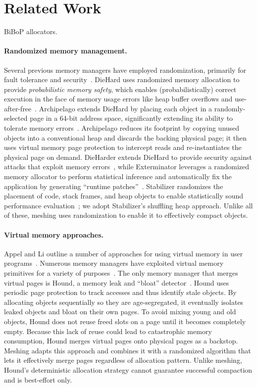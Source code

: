 \section{Related Work}
\label{sec:related}

BiBoP allocators.

\paragraph{Randomized memory management.} Several previous memory managers have employed randomization,
primarily for fault tolerance and
security~\cite{Novark:2010:DSH:1866307.1866371, 1134000, 1346296,
  1250736}. DieHard uses randomized memory allocation to provide
\emph{probabilistic memory safety}, which enables (probabilistically)
correct execution in the face of memory usage errors like heap buffer
overflows and use-after-free~\cite{1134000}. Archipelago extends
DieHard by placing each object in a randomly-selected page in a 64-bit
address space, significantly extending its ability to tolerate memory
errors~\cite{1346296}. Archipelago reduces its footprint by copying
unused objects into a conventional heap and discards the backing
physical page; it then uses virtual memory page protection to
intercept reads and re-instantiates the physical page on
demand. DieHarder extends DieHard to provide security against attacks
that exploit memory errors~\cite{Novark:2010:DSH:1866307.1866371},
while Exterminator leverages a randomized memory allocator to perform
statistical inference and automatically fix the application by
generating ``runtime patches''~\cite{1250736}. Stabilizer randomizes
the placement of code, stack frames, and heap objects to enable
statistically sound performance evaluation~\cite{stabilizer:asplos13};
we adopt Stabilizer's shuffling heap approach. Unlike all of these,
meshing uses randomization to enable it to effectively compact objects.

\paragraph{Virtual memory approaches.}
Appel and Li outline a number of approaches for using virtual memory
in user programs~\cite{Appel:1991:VMP:106972.106984}. Numerous memory
managers have exploited virtual memory primitives for a variety of
purposes~\cite{Novark:2010:DSH:1866307.1866371,1346296,Appel:1988:RCC:53990.53992,Boehm:1991:MPG:113445.113459}. The
only memory manager that merges virtual pages is Hound, a memory leak
and ``bloat'' detector~\cite{1542521}. Hound uses periodic page
protection to track accesses and thus identify stale objects. By
allocating objects sequentially so they are age-segregated, it
eventually isolates leaked objects and bloat on their own pages. To
avoid mixing young and old objects, Hound does not reuse freed slots
on a page until it becomes completely empty. Because this lack of
reuse could lead to catastrophic memory consumption, Hound merges
virtual pages onto physical pages as a backstop. Meshing adapts this
approach and combines it with a randomized algorithm that lets it
effectively merge pages regardless of allocation pattern. Unlike
meshing, Hound's deterministic allocation strategy cannot guarantee
successful compaction and is best-effort only.
